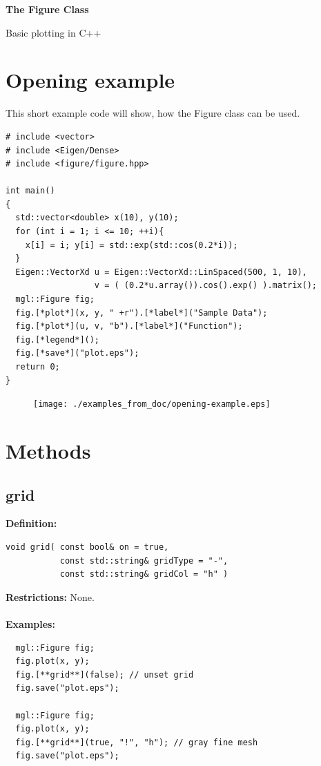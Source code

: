 \documentclass[a4paper]{article}
\newcommand{\command}[1]{\subsection{#1}}
\begin{document}
\begin{center}
  \begin{huge}
    \textbf{The Figure Class\\}
  \end{huge}
  Basic plotting in C++
\end{center}
  
\vspace*{3cm}
  \tableofcontents
\vspace*{\fill}


\section{Opening example}

This short example code will show, how the Figure class can be used.
\begin{lstlisting}
# include <vector>
# include <Eigen/Dense>
# include <figure/figure.hpp>

int main()
{
  std::vector<double> x(10), y(10);
  for (int i = 1; i <= 10; ++i){ 
    x[i] = i; y[i] = std::exp(std::cos(0.2*i));
  }
  Eigen::VectorXd u = Eigen::VectorXd::LinSpaced(500, 1, 10),
                  v = ( (0.2*u.array()).cos().exp() ).matrix();
  mgl::Figure fig;
  fig.[*plot*](x, y, " +r").[*label*]("Sample Data");
  fig.[*plot*](u, v, "b").[*label*]("Function");
  fig.[*legend*]();
  fig.[*save*]("plot.eps");
  return 0;
}
\end{lstlisting}

\begin{figure}[h]
  \centering
  \texttt{[image: ./examples\_from\_doc/opening-example.eps]}
  \thispagestyle{empty}
\end{figure}

\restoregeometry
\section{Methods}

\command{grid}

\textbf{Definition:}
\begin{lstlisting}
void grid( const bool& on = true, 
           const std::string& gridType = "-", 
           const std::string& gridCol = "h" )
\end{lstlisting}
%
\textbf{Restrictions:} None. \\ \\
%
\textbf{Examples:}
\begin{lstlisting}
  mgl::Figure fig;
  fig.plot(x, y);
  fig.[**grid**](false); // unset grid
  fig.save("plot.eps");

  mgl::Figure fig;
  fig.plot(x, y);
  fig.[**grid**](true, "!", "h"); // gray fine mesh
  fig.save("plot.eps");
\end{lstlisting}
\end{document}
